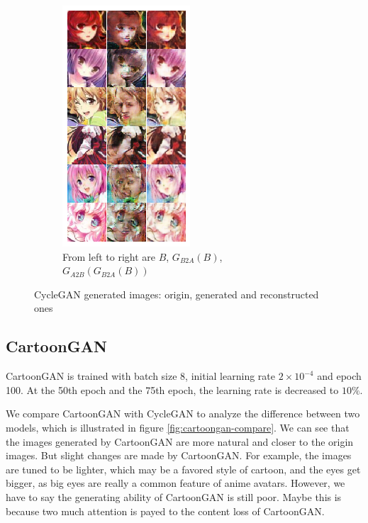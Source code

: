 \documentclass[10pt,twocolumn,letterpaper]{article}
\begin{document}
\begin{figure}[h]
\begin{subfigure}{.48\linewidth}
      \includegraphics[width=.7\linewidth]{cycle-result-target.png}
      \caption{From left to right are $B$, $G_{B2A}(B)$, $G_{A2B}(G_{B2A}(B))$}
   \end{subfigure}
   \caption{CycleGAN generated images: origin, generated and reconstructed ones}
   \label{fig:cyclegan-examples}
\end{figure}

\subsection{CartoonGAN}

CartoonGAN is trained with batch size 8, initial learning rate $2\times 10^{-4}$
and epoch 100. At the 50th epoch and the 75th epoch, the learning rate is
decreased to $10\%$.

We compare CartoonGAN with CycleGAN to analyze the difference between two
models, which is illustrated in figure \ref{fig:cartoongan-compare}. We can see
that the images generated by CartoonGAN are more natural and closer to the
origin images. But slight changes are made by CartoonGAN. For example, the
images are tuned to be lighter, which may be a favored style of cartoon, and the
eyes get bigger, as big eyes are really a common feature of anime avatars.
However, we have to say the generating ability of CartoonGAN is still poor.
Maybe this is because two much attention is payed to the content loss of
CartoonGAN.
\end{document}
